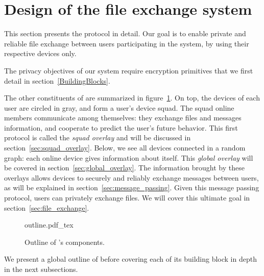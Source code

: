 \section{Design of the \name file exchange system}

This section presents the \name protocol in detail.
Our goal is to enable private and reliable file exchange between users participating in the system, by using their respective devices only.

The privacy objectives of our system require encryption primitives that we first detail in section~\ref{BuildingBlocks}. 

The other constituents of \name are summarized in figure~\ref{fig:outline}.
On top, the devices of each user are circled in gray, and form a user's device squad. The squad online members communicate among themselves: they exchange files and messages information, and cooperate to predict the user's future behavior. This first protocol is called the \emph{squad overlay} and will be discussed in section~\ref{sec:squad_overlay}.
Below, we see all devices connected in a random graph: each online device gives information about itself. This \emph{global overlay} will be covered in section~\ref{sec:global_overlay}.
The information brought by these overlays allows devices to securely and reliably exchange messages between users, as will be explained in section~\ref{sec:message_passing}.
Given this message passing protocol, users can privately exchange files. We will cover this ultimate goal in section~\ref{sec:file_exchange}.

\begin{figure}[t]
\centering
\def\svgwidth{\columnwidth}
%
{outline.pdf_tex}
\caption{\label{fig:outline}Outline of \name's components.}

\end{figure}

We present a global outline of \name before covering each of its building block in depth in the next subsections.


